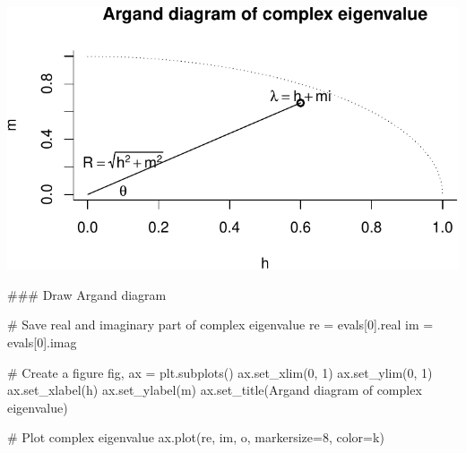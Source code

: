 \documentclass[
  letterpaper,
  DIV=11,
  numbers=noendperiod]{scrreprt}
\newenvironment{Shaded}{\begin{snugshade}}{\end{snugshade}}
\newcommand{\CommentTok}[1]{\textcolor[rgb]{0.37,0.37,0.37}{#1}}
\newcommand{\DecValTok}[1]{\textcolor[rgb]{0.68,0.00,0.00}{#1}}
\newcommand{\NormalTok}[1]{\textcolor[rgb]{0.00,0.23,0.31}{#1}}
\newcommand{\OperatorTok}[1]{\textcolor[rgb]{0.37,0.37,0.37}{#1}}
\newcommand{\StringTok}[1]{\textcolor[rgb]{0.13,0.47,0.30}{#1}}
\begin{document}
\includegraphics{intro_stability_analysis_files/figure-pdf/stab_analysis4-1.pdf}

\begin{tcolorbox}[enhanced jigsaw, titlerule=0mm, breakable, bottomrule=.15mm, toprule=.15mm, colbacktitle=quarto-callout-note-color!10!white, rightrule=.15mm, toptitle=1mm, opacityback=0, left=2mm, coltitle=black, title=\textcolor{quarto-callout-note-color}{\faInfo}\hspace{0.5em}{Python code}, colframe=quarto-callout-note-color-frame, opacitybacktitle=0.6, leftrule=.75mm, bottomtitle=1mm, arc=.35mm, colback=white]

\begin{Shaded}
\begin{Highlighting}[]
\CommentTok{\#\#\# Draw Argand diagram}

\CommentTok{\# Save real and imaginary part of complex eigenvalue}
\NormalTok{re }\OperatorTok{=}\NormalTok{ evals[}\DecValTok{0}\NormalTok{].real}
\NormalTok{im }\OperatorTok{=}\NormalTok{ evals[}\DecValTok{0}\NormalTok{].imag}

\CommentTok{\# Create a figure}
\NormalTok{fig, ax }\OperatorTok{=}\NormalTok{ plt.subplots()}
\NormalTok{ax.set\_xlim(}\DecValTok{0}\NormalTok{, }\DecValTok{1}\NormalTok{)}
\NormalTok{ax.set\_ylim(}\DecValTok{0}\NormalTok{, }\DecValTok{1}\NormalTok{)}
\NormalTok{ax.set\_xlabel(}\StringTok{\textquotesingle{}h\textquotesingle{}}\NormalTok{)}
\NormalTok{ax.set\_ylabel(}\StringTok{\textquotesingle{}m\textquotesingle{}}\NormalTok{)}
\NormalTok{ax.set\_title(}\StringTok{\textquotesingle{}Argand diagram of complex eigenvalue\textquotesingle{}}\NormalTok{)}

\CommentTok{\# Plot complex eigenvalue}
\NormalTok{ax.plot(re, im, }\StringTok{\textquotesingle{}o\textquotesingle{}}\NormalTok{, markersize}\OperatorTok{=}\DecValTok{8}\NormalTok{, color}\OperatorTok{=}\StringTok{\textquotesingle{}k\textquotesingle{}}\NormalTok{)}


\end{Highlighting}
\end{Shaded}
\end{tcolorbox}
\end{document}
